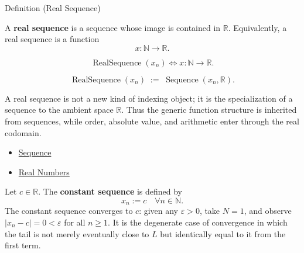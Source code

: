 \begin{definitionbox}{Definition (Real Sequence)}
\begin{definition}
\label{def:real-sequence}

A \textbf{real sequence} is a sequence whose image is contained in
$\mathbb{R}$. Equivalently, a real sequence is a function
\[
    x : \mathbb{N} \to \mathbb{R}.
\]
\end{definition}
\end{definitionbox}

\begin{remark*}
\[
\operatorname{RealSequence}(x_n)
\Longleftrightarrow
x:\mathbb{N}\to\mathbb{R}.
\]
\end{remark*}

\begin{remark*}
\[
\operatorname{RealSequence}(x_n)
\;:=\;
\operatorname{Sequence}(x_n,\mathbb{R}).
\]
\end{remark*}

\begin{remark*}[Interpretation]
A real sequence is not a new kind of indexing object; it is the
specialization of a sequence to the ambient space $\mathbb{R}$. Thus the
generic function structure is inherited from sequences, while order,
absolute value, and arithmetic enter through the real codomain.
\end{remark*}

\begin{dependencies}
\begin{itemize}
  \item \hyperref[def:sequence]{Sequence}
  \item \hyperref[def:reals]{Real Numbers}
\end{itemize}
\end{dependencies}

\begin{example*}
\label{ex:constant-sequence}

Let $c \in \mathbb{R}$. The \textbf{constant sequence} is defined by
\[
    x_n := c \quad \forall n \in \mathbb{N}.
\]
The constant sequence converges to $c$: given any $\varepsilon > 0$,
take $N = 1$, and observe $|x_n - c| = 0 < \varepsilon$ for all $n \ge 1$.
It is the degenerate case of convergence in which the tail is not merely
eventually close to $L$ but identically equal to it from the first term.
\end{example*}

